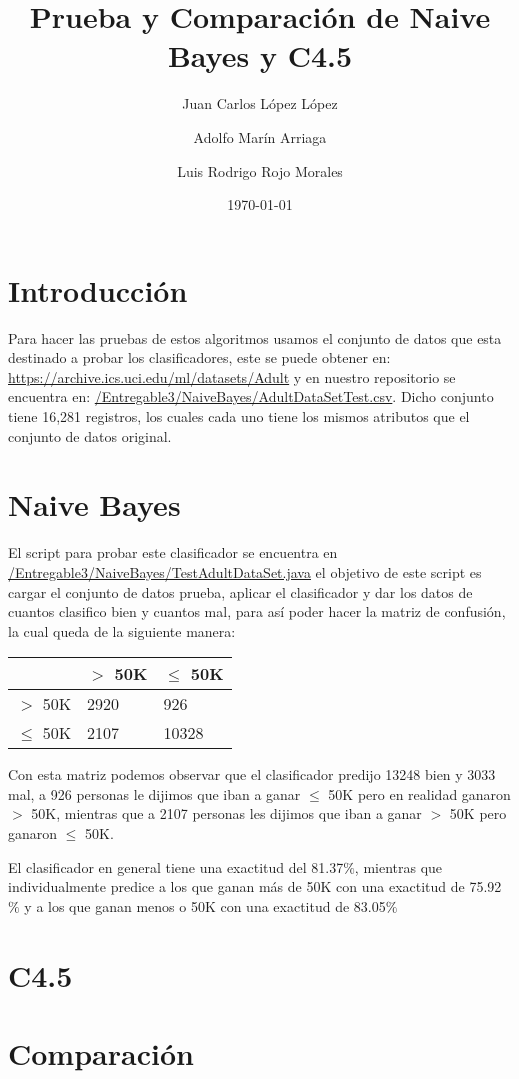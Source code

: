 \documentclass{article}
\title{Prueba y Comparación de Naive Bayes y C4.5}
\author{Juan Carlos López López \and Adolfo Marín Arriaga \and Luis Rodrigo Rojo Morales}
\date{\today\\}
\begin{document}
 \maketitle
 \section{Introducción}
 Para hacer las pruebas de estos algoritmos usamos el conjunto de datos que esta destinado a probar los clasificadores, este se puede obtener en: \href{https://archive.ics.uci.edu/ml/datasets/Adult} {https://archive.ics.uci.edu/ml/datasets/Adult} y en nuestro repositorio se encuentra en: \href{https://github.com/rodrigorojo/ProyectoFinalMineria/blob/master/Entregable3/NaiveBayes/AdultDataSetTest.csv}{/Entregable3/NaiveBayes/AdultDataSetTest.csv}. Dicho conjunto tiene 16,281 registros, los cuales cada uno tiene los mismos atributos que el conjunto de datos original.

 \section{Naive Bayes}
 El script para probar este clasificador se encuentra en \href{https://github.com/rodrigorojo/ProyectoFinalMineria/blob/master/Entregable3/NaiveBayes/TestAdultDataSet.java} {/Entregable3/NaiveBayes/TestAdultDataSet.java} el objetivo de este script es cargar el conjunto de datos prueba, aplicar el clasificador y dar los datos de cuantos clasifico bien y cuantos mal, para así poder hacer la matriz de confusión, la cual queda de la siguiente manera:
 \begin{center}
   \begin{tabular}{|p{2cm}|p{2cm}|p{2cm}|}
     \hline
                  & $>$ 50K & $\leq$ 50K  \\ \hline
      $>$ 50K     & 2920    & 926         \\ \hline
      $\leq$ 50K  & 2107    & 10328        \\ \hline
    \end{tabular}
 \end{center}
 Con esta matriz podemos observar que el clasificador predijo 13248 bien y 3033 mal, a 926 personas le dijimos que iban a ganar $\leq$ 50K pero en realidad ganaron $>$ 50K, mientras que a 2107 personas les dijimos que iban a ganar $>$ 50K pero ganaron $\leq$ 50K.

 El clasificador en general tiene una exactitud del 81.37$\%$, mientras que individualmente predice a los que ganan más de 50K con una exactitud de 75.92$\%$ y a los que ganan menos o 50K con una exactitud de 83.05$\%$
 \section{C4.5}
 \section{Comparación}
\end{document}

